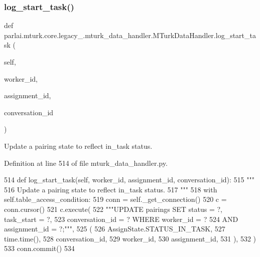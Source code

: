 \subsubsection{\texorpdfstring{log\+\_\+start\+\_\+task()}{log\_start\_task()}}
{\footnotesize\ttfamily def parlai.\+mturk.\+core.\+legacy\+\_.\+mturk\+\_\+data\+\_\+handler.\+M\+Turk\+Data\+Handler.\+log\+\_\+start\+\_\+task (\begin{DoxyParamCaption}\item[{}]{self,  }\item[{}]{worker\+\_\+id,  }\item[{}]{assignment\+\_\+id,  }\item[{}]{conversation\+\_\+id }\end{DoxyParamCaption})}

\begin{DoxyVerb}Update a pairing state to reflect in_task status.
\end{DoxyVerb}
 

Definition at line 514 of file mturk\+\_\+data\+\_\+handler.\+py.


\begin{DoxyCode}
514     \textcolor{keyword}{def }log\_start\_task(self, worker\_id, assignment\_id, conversation\_id):
515         \textcolor{stringliteral}{"""}
516 \textcolor{stringliteral}{        Update a pairing state to reflect in\_task status.}
517 \textcolor{stringliteral}{        """}
518         with self.table\_access\_condition:
519             conn = self.\_get\_connection()
520             c = conn.cursor()
521             c.execute(
522                 \textcolor{stringliteral}{"""UPDATE pairings SET status = ?, task\_start = ?,}
523 \textcolor{stringliteral}{                         conversation\_id = ? WHERE worker\_id = ?}
524 \textcolor{stringliteral}{                         AND assignment\_id = ?;"""},
525                 (
526                     AssignState.STATUS\_IN\_TASK,
527                     time.time(),
528                     conversation\_id,
529                     worker\_id,
530                     assignment\_id,
531                 ),
532             )
533             conn.commit()
534 
\end{DoxyCode}
\mbox{\label{classparlai_1_1mturk_1_1core_1_1legacy__2018_1_1mturk__data__handler_1_1MTurkDataHandler_a003f7a51af6ded2072ad521bf7acf0cb}} 
